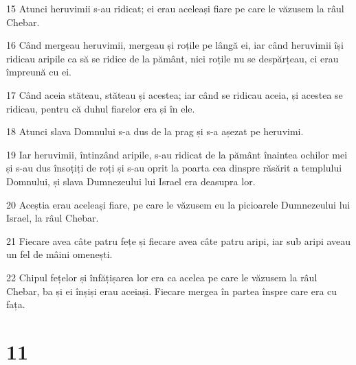 \par 15 Atunci heruvimii s-au ridicat; ei erau aceleași fiare pe care le văzusem la râul Chebar.
\par 16 Când mergeau heruvimii, mergeau și roțile pe lângă ei, iar când heruvimii își ridicau aripile ca să se ridice de la pământ, nici roțile nu se despărțeau, ci erau împreună cu ei.
\par 17 Când aceia stăteau, stăteau și acestea; iar când se ridicau aceia, și acestea se ridicau, pentru că duhul fiarelor era și în ele.
\par 18 Atunci slava Domnului s-a dus de la prag și s-a așezat pe heruvimi.
\par 19 Iar heruvimii, întinzând aripile, s-au ridicat de la pământ înaintea ochilor mei și s-au dus însoțiți de roți și s-au oprit la poarta cea dinspre răsărit a templului Domnului, și slava Dumnezeului lui Israel era deasupra lor.
\par 20 Aceștia erau aceleași fiare, pe care le văzusem eu la picioarele Dumnezeului lui Israel, la râul Chebar.
\par 21 Fiecare avea câte patru fețe și fiecare avea câte patru aripi, iar sub aripi aveau un fel de mâini omenești.
\par 22 Chipul fețelor și înfățișarea lor era ca acelea pe care le văzusem la râul Chebar, ba și ei înșiși erau aceiași. Fiecare mergea în partea înspre care era cu fața.

\chapter{11}

